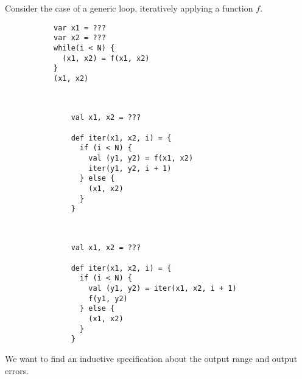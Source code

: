 \section{}
Consider the case of a generic loop, iteratively applying a function $f$.
\begin{figure}[h!]
  \centering
  \lstset{numbers=none}
  \begin{subfigure}[b]{0.25\textwidth}
    \begin{lstlisting}
var x1 = ???
var x2 = ???
while(i < N) {
  (x1, x2) = f(x1, x2)
}
(x1, x2)
    \end{lstlisting}
  \end{subfigure}%
  ~ %
  \begin{subfigure}[b]{0.32\textwidth}
    \begin{lstlisting}
    val x1, x2 = ???

    def iter(x1, x2, i) = {
      if (i < N) {
        val (y1, y2) = f(x1, x2)
        iter(y1, y2, i + 1)
      } else {
        (x1, x2)
      }
    }
    \end{lstlisting}
  \end{subfigure}
  ~ %
  \begin{subfigure}[b]{0.32\textwidth}
    \begin{lstlisting}
    val x1, x2 = ???

    def iter(x1, x2, i) = {
      if (i < N) {
        val (y1, y2) = iter(x1, x2, i + 1)
        f(y1, y2)
      } else {
        (x1, x2)
      }
    }
    \end{lstlisting}
  \end{subfigure}
\end{figure}


We want to find an inductive specification about the output range and output errors.




